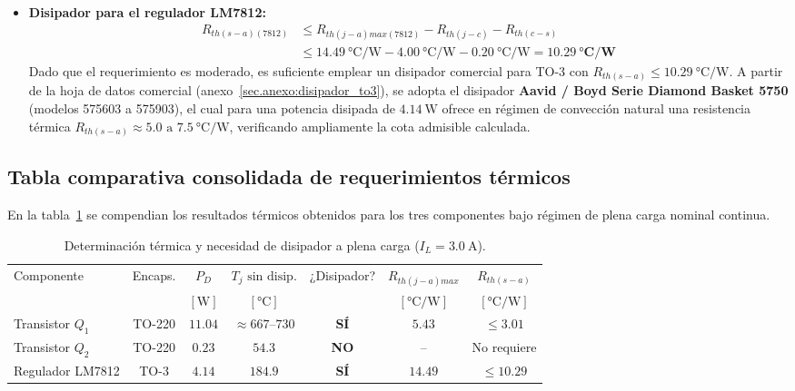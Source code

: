 \begin{enumerate}
\begin{itemize}
        \item \textbf{Disipador para el regulador LM7812:}
        \begin{align*}
            R_{th(s-a)(7812)} &\le R_{th(j-a)max(7812)} - R_{th(j-c)} - R_{th(c-s)} \\
            &\le \SI{14.49}{\celsius/\watt} - \SI{4.00}{\celsius/\watt} - \SI{0.20}{\celsius/\watt} = \mathbf{\SI{10.29}{\celsius/\watt}}
        \end{align*}
        Dado que el requerimiento es moderado, es suficiente emplear un disipador comercial para TO-3 con $R_{th(s-a)} \le \SI{10.29}{\celsius/\watt}$. A partir de la hoja de datos comercial (anexo~\ref{sec.anexo:disipador_to3}), se adopta el disipador \textbf{Aavid / Boyd Serie Diamond Basket 5750} (modelos 575603 a 575903), el cual para una potencia disipada de $\SI{4.14}{\watt}$ ofrece en régimen de convección natural una resistencia térmica $R_{th(s-a)} \approx 5.0\text{ a }\SI{7.5}{\celsius/\watt}$, verificando ampliamente la cota admisible calculada.
    \end{itemize}
\end{enumerate}

\subsection{Tabla comparativa consolidada de requerimientos térmicos}
En la tabla~\ref{tab.c5:resumen_termico} se compendian los resultados térmicos obtenidos para los tres componentes
bajo régimen de plena carga nominal continua.

\begin{table}[!ht]
\centering
\small
\setlength{\tabcolsep}{3.5pt}
\caption{Determinación térmica y necesidad de disipador a plena carga ($I_L = \SI{3.0}{\ampere}$).}
\label{tab.c5:resumen_termico}
\begin{tabular}{lcccccc}
\hline
Componente & Encaps. & $P_D$ & $T_j\text{ sin disip.}$ & ¿Disipador? & $R_{th(j-a)max}$ & $R_{th(s-a)}$ \\
 & & $[\si{\watt}]$ & $[\si{\celsius}]$ & & $[\si{\celsius/\watt}]$ & $[\si{\celsius/\watt}]$ \\
\hline
Transistor $Q_1$ & TO-220 & $11.04$ & $\approx 667$--$730$ & \textbf{SÍ} & $5.43$ & $\le \mathbf{3.01}$ \\
Transistor $Q_2$ & TO-220 & $0.23$  & $54.3$ & \textbf{NO} & -- & No requiere \\
Regulador LM7812 & TO-3   & $4.14$  & $184.9$ & \textbf{SÍ} & $14.49$ & $\le \mathbf{10.29}$ \\
\hline
\end{tabular}
\end{table}

